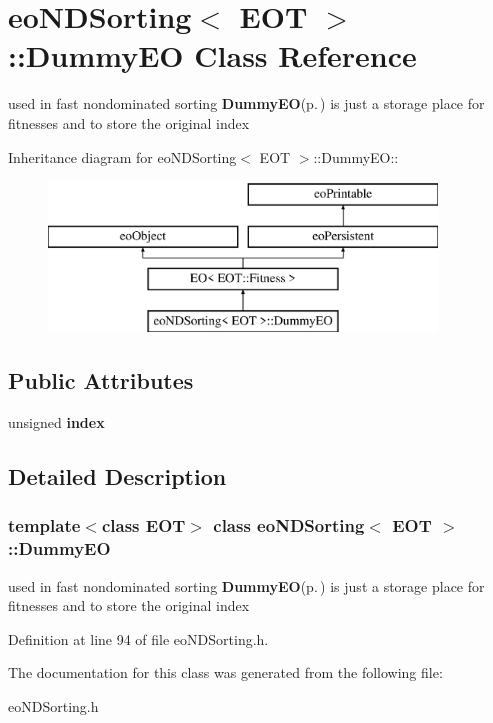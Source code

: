 \section{eo\-NDSorting$<$ EOT $>$::Dummy\-EO Class Reference}
\label{classeo_n_d_sorting_1_1_dummy_e_o}
used in fast nondominated sorting {\bf Dummy\-EO}{\rm (p.\,\pageref{classeo_n_d_sorting_1_1_dummy_e_o})} is just a storage place for fitnesses and to store the original index  


Inheritance diagram for eo\-NDSorting$<$ EOT $>$::Dummy\-EO::\begin{figure}[H]
\begin{center}
\leavevmode
\includegraphics[height=4cm]{classeo_n_d_sorting_1_1_dummy_e_o}
\end{center}
\end{figure}
\subsection*{Public Attributes}
\begin{CompactItemize}
\item 
unsigned {\bf index}\label{classeo_n_d_sorting_1_1_dummy_e_o_o0}

\end{CompactItemize}


\subsection{Detailed Description}
\subsubsection*{template$<$class EOT$>$ class eo\-NDSorting$<$ EOT $>$::Dummy\-EO}

used in fast nondominated sorting {\bf Dummy\-EO}{\rm (p.\,\pageref{classeo_n_d_sorting_1_1_dummy_e_o})} is just a storage place for fitnesses and to store the original index 



Definition at line 94 of file eo\-NDSorting.h.

The documentation for this class was generated from the following file:\begin{CompactItemize}
\item 
eo\-NDSorting.h\end{CompactItemize}
